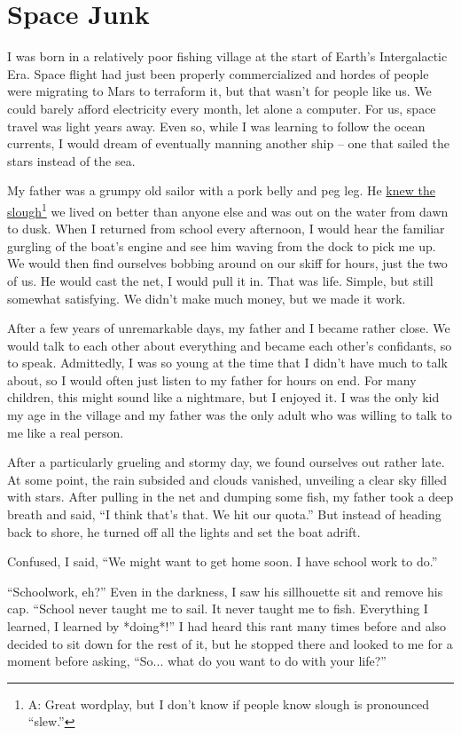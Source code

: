 \chapter{Space Junk}

I was born in a relatively poor fishing village at the start of Earth's Intergalactic Era.
Space flight had just been properly commercialized and hordes of people were migrating to Mars to terraform it, but that wasn't for people like us.
We could barely afford electricity every month, let alone a computer.
For us, space travel was light years away.
Even so, while I was learning to follow the ocean currents, I would dream of eventually manning another ship -- one that sailed the stars instead of the sea.

My father was a grumpy old sailor with a pork belly and peg leg.
He \underline{knew the slough}\footnote{A: Great wordplay, but I don't know if people know slough is pronounced ``slew.''} we lived on better than anyone else and was out on the water from dawn to dusk.
When I returned from school every afternoon, I would hear the familiar gurgling of the boat's engine and see him waving from the dock to pick me up.
We would then find ourselves bobbing around on our skiff for hours, just the two of us.
He would cast the net, I would pull it in.
That was life.
Simple, but still somewhat satisfying.
We didn't make much money, but we made it work.

After a few years of unremarkable days, my father and I became rather close.
We would talk to each other about everything and became each other's confidants, so to speak.
Admittedly, I was so young at the time that I didn't have much to talk about, so I would often just listen to my father for hours on end.
For many children, this might sound like a nightmare, but I enjoyed it.
I was the only kid my age in the village and my father was the only adult who was willing to talk to me like a real person.

After a particularly grueling and stormy day, we found ourselves out rather late.
At some point, the rain subsided and clouds vanished, unveiling a clear sky filled with stars.
After pulling in the net and dumping some fish, my father took a deep breath and said, ``I think that's that. We hit our quota.''
But instead of heading back to shore, he turned off all the lights and set the boat adrift.

Confused, I said, ``We might want to get home soon. I have school work to do.''

``Schoolwork, eh?''
Even in the darkness, I saw his sillhouette sit and remove his cap.
``School never taught me to sail. It never taught me to fish. Everything I learned, I learned by *doing*!''
I had heard this rant many times before and also decided to sit down for the rest of it, but he stopped there and looked to me for a moment before asking, ``So... what do you want to do with your life?''

